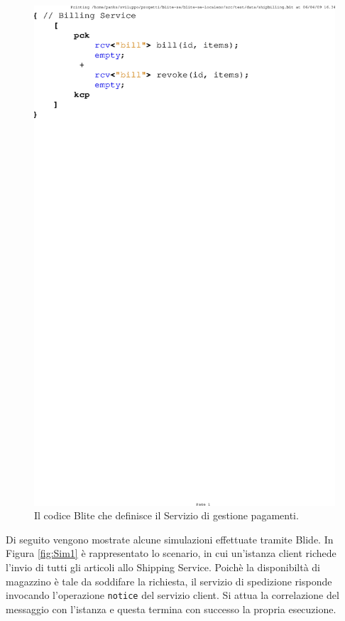 \begin{figure}[p!]
\begin{center}
  \includegraphics[scale=0.80,clip]{blide/dia/billing}
   \caption[Codice Blite, interfaccia Billing Service]{Il codice Blite che
   definisce il Servizio di gestione pagamenti.}
  \label{fig:billing}
\end{center}
\end{figure}

Di seguito vengono mostrate alcune simulazioni effettuate tramite Blide. In
Figura \ref{fig:Sim1} è rappresentato lo scenario, in cui un'istanza client
richede l'invio di tutti gli articoli allo Shipping Service. Poichè la
disponibiltà di magazzino è tale da soddifare la richiesta, il servizio di
spedizione risponde invocando l'operazione \texttt{notice} del servizio client.
Si attua la correlazione del messaggio con l'istanza e questa termina con
successo la propria esecuzione.

